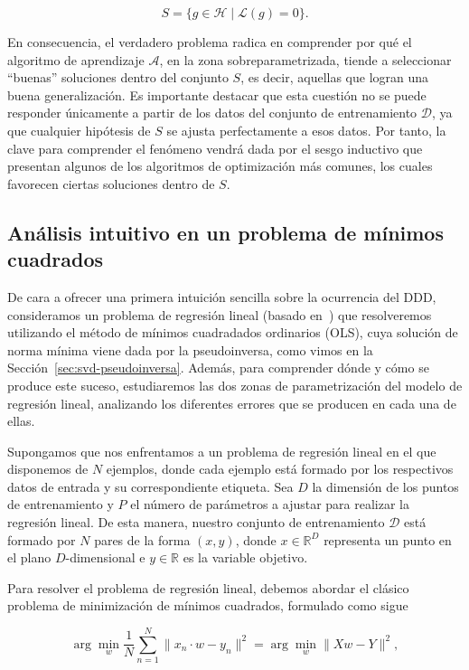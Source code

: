 \[
    S = \{ g \in \mathcal{H} \mid \mathcal{L}(g) = 0 \}.
\]

En consecuencia, el verdadero problema radica en comprender por qué el algoritmo de aprendizaje $\mathcal{A}$, en la zona sobreparametrizada, tiende a seleccionar ``buenas'' soluciones dentro del conjunto $S$, es decir, aquellas que logran una buena generalización. Es importante destacar que esta cuestión no se puede responder únicamente a partir de los datos del conjunto de entrenamiento $\mathcal{D}$, ya que cualquier hipótesis de $S$ se ajusta perfectamente a esos datos. Por tanto, la clave para comprender el fenómeno vendrá dada por el sesgo inductivo que presentan algunos de los algoritmos de optimización más comunes, los cuales favorecen ciertas soluciones dentro de $S$.

\subsection{Análisis intuitivo en un problema de mínimos cuadrados}\label{subsec:analisis-intuitivo-minimos-cuadrados}

De cara a ofrecer una primera intuición sencilla sobre la ocurrencia del DDD, consideramos un problema de regresión lineal (basado en~\cite{Schaeffer2023}) que resolveremos utilizando el método de mínimos cuadradados ordinarios (OLS), cuya solución de norma mínima viene dada por la pseudoinversa, como vimos en la Sección~\ref{sec:svd-pseudoinversa}. Además, para comprender dónde y cómo se produce este suceso, estudiaremos las dos zonas de parametrización del modelo de regresión lineal, analizando los diferentes errores que se producen en cada una de ellas.

Supongamos que nos enfrentamos a un problema de regresión lineal en el que disponemos de $N$ ejemplos, donde cada ejemplo está formado por los respectivos datos de entrada y su correspondiente etiqueta. Sea $D$ la dimensión de los puntos de entrenamiento y $P$ el número de parámetros a ajustar para realizar la regresión lineal. De esta manera, nuestro conjunto de entrenamiento $\mathcal{D}$ está formado por $N$ pares de la forma $(x,y)$, donde $x \in \mathbb{R}^{D}$ representa un punto en el plano $D$-dimensional e $y \in \mathbb{R}$ es la variable objetivo.

Para resolver el problema de regresión lineal, debemos abordar el clásico problema de minimización de mínimos cuadrados, formulado como sigue

\begin{equation}\label{eq:minimos-cuadrados1}
    \arg\min_{w} \frac{1}{N}\sum_{n=1}^{N}\| x_n \cdot w - y_n \|^{2} = \arg\min_{w}\| Xw - Y \|^{2},
\end{equation}

